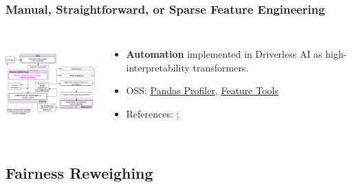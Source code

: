\documentclass[11pt,
               aspectratio=169,
               hyperref={colorlinks}
               ]{beamer}
\begin{document}
			\begin{frame}
		
				\frametitle{Manual, Straightforward, or Sparse Feature Engineering}		
		
				\begin{columns}
	
					\centering
					\includegraphics[height=100pt]{img/fe.png}
				
					\vspace{-5pt}
					\begin{itemize}
						\item \textbf{Automation} implemented in Driverless AI as high-interpretability transformers.
						\item OSS: \href{https://github.com/pandas-profiling/pandas-profiling}{Pandas Profiler}, \href{https://index.pocketcluster.io/featuretools-featuretools.html}{Feature Tools}
						\item References: ; 
					\end{itemize}
				
				\end{columns}		
		
			\end{frame}
	
		\subsection{Fairness Reweighing}
	
\end{document}

